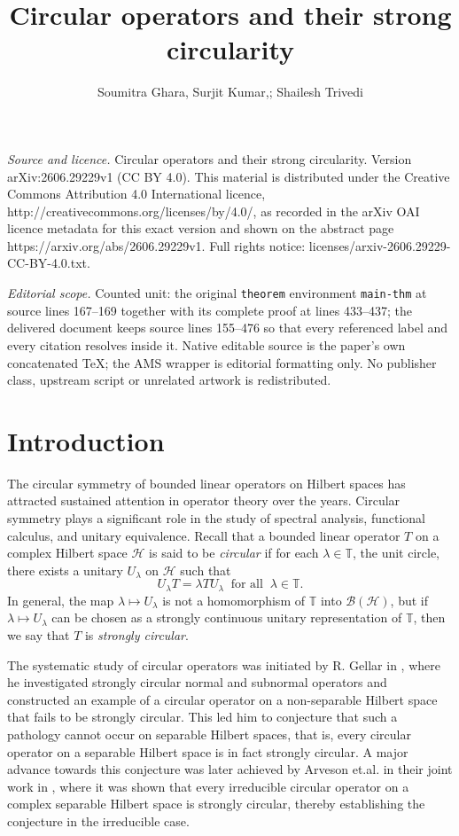 \documentclass[10pt,a4paper]{amsart}
\begin{document}
\title[Circular operators and their strong circularity]{Circular operators and their strong circularity}
\author{Soumitra Ghara, Surjit Kumar,; Shailesh Trivedi}
\date{}
\maketitle
\noindent\emph{Source and licence.} Circular operators and their strong circularity. Version arXiv:2606.29229v1 (CC BY 4.0). This material is distributed under the Creative Commons Attribution 4.0 International licence, http://creativecommons.org/licenses/by/4.0/, as recorded in the arXiv OAI licence metadata for this exact version and shown on the abstract page https://arxiv.org/abs/2606.29229v1. Full rights notice: licenses/arxiv-2606.29229-CC-BY-4.0.txt.\par\smallskip
\noindent\textit{Editorial scope.} Counted unit: the original \texttt{theorem} environment \texttt{main-thm} at source lines 167--169 together with its complete proof at lines 433--437; the delivered document keeps source lines 155--476 so that every referenced label and every citation resolves inside it. Native editable source is the paper's own concatenated TeX; the AMS wrapper is editorial formatting only. No publisher class, upstream script or unrelated artwork is redistributed.
\section{Introduction}

The circular symmetry of bounded linear operators on Hilbert spaces has attracted sustained attention in operator theory over the years. Circular symmetry plays a significant role in the study of spectral analysis, functional calculus, and unitary equivalence. Recall that a bounded linear operator $T$ on a complex Hilbert space $\mathcal H$ is said to be {\it circular} if for each $\lambda \in \mathbb T$, the unit circle, there exists a unitary $U_\lambda$ on $\mathcal H$ such that
\[
U_\lambda T = \lambda T U_\lambda\ \text{ for all }\ \lambda \in \mathbb T.
\]
In general, the map $\lambda \mapsto U_\lambda$ is not a homomorphism of $\mathbb T$ into $\mathcal B(\mathcal H)$, but if $\lambda \mapsto U_\lambda$ can be chosen as a strongly continuous unitary representation of $\mathbb T$, then we say that $T$ is {\it strongly circular}. 

The systematic study of circular operators was initiated by R. Gellar in \cite{G}, where he investigated strongly circular normal and subnormal operators and constructed an example of a circular operator on a non-separable Hilbert space that fails to be strongly circular. This led him to conjecture that such a pathology cannot occur on separable Hilbert spaces, that is, every circular operator on a separable Hilbert space is in fact strongly circular. A major advance towards this conjecture was later achieved by Arveson et.al. in their joint work in \cite{AHHK}, where it was shown that every irreducible circular operator on a complex separable Hilbert space is strongly circular, thereby establishing the conjecture in the irreducible case.
\end{document}
